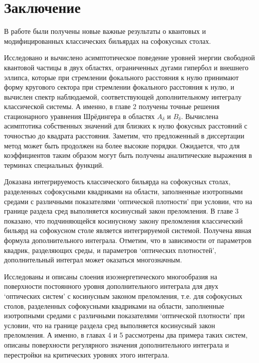 \chapter*{Заключение}                       %


В работе были получены новые важные результаты о квантовых и модифицированных классических бильярдах на софокусных столах.

Исследовано и вычислено асимптотическое поведение уровней энергии свободной квантовой частицы в двух областях, ограниченных дугами гипербол и внешнего эллипса, которые при стремлении фокального расстояния к нулю принимают форму кругового сектора при стремлении фокального расстояния к нулю, и вычислен спектр наблюдаемой, соответствующей дополнительному интегралу классической системы.
А именно, в главе 2 получены точные решения стационарного уравнения Шрёдингера в областях $A_\delta$ и $B_\delta$. Вычислена асимптотика собственных значений для близких к нулю фокусных расстояний с точностью до квадрата расстояния. 
Заметим, что предложенный в диссертации метод может быть продолжен на более высокие порядки. Ожидается, что для коэффициентов таким образом могут быть получены аналитические выражения в терминах специальных функций.

Доказана интегрируемость классического бильярда на софокусных столах, разделенных софокусными квадриками на области, заполненные изотропными средами с различными показателями `оптической плотности' при условии, что на границе раздела сред выполняется косинусный закон преломления.
В главе 3 показано, что подчиняющейся косинусному закону преломления классический бильярд на софокусном столе является интегрируемой системой. 
Получена явная формула дополнительного интеграла. Отметим, что в зависимости от параметров квадрик, разделяющих среды, и параметров `оптических плотностей', дополнительный интеграл может оказаться многозначным. 


Исследованы и описаны слоения изоэнергетического многообразия на поверхности постоянного уровня дополнительного интеграла для двух `оптических систем' с косинусным законом преломления, т.е. для софокусных столов, разделенных софокусными квадриками на области, заполненные изотропными средами с различными показателями `оптической плотности'  при условии, что на границе раздела сред выполняется косинусный закон преломления.
А именно, в главах 4 и 5 рассмотрены два примера таких систем, описаны поверхности регулярного значения дополнительного интеграла и перестройки на критических уровнях этого интеграла. 


